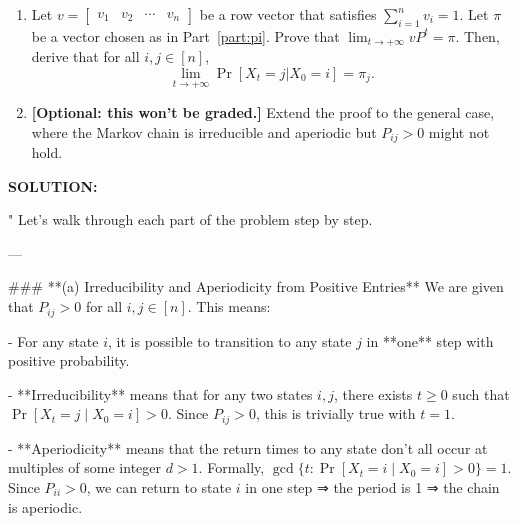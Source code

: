 \begin{enumerate}
\begin{enumerate}

    \item {} Let $v = \begin{bmatrix}v_1 & v_2 & \cdots & v_n\end{bmatrix}$ be a row vector that satisfies $\sum_{i=1}^nv_i = 1$. Let $\pi$ be a vector chosen as in Part~\ref{part:pi}. Prove that $\lim_{t\to+\infty}vP^t = \pi$. Then, derive that for all $i, j \in [n]$,
        \[\lim_{t\to+\infty}\Pr[X_t = j|X_0 = i] = \pi_j.\]


    \item {} \textbf{[Optional: this won't be graded.]} Extend the proof to the general case, where the Markov chain is irreducible and aperiodic but $P_{ij} > 0$ might not hold.
\end{enumerate}

\ifdefined\template
\begin{shaded}
\textbf{SOLUTION:}
\ifdefined\sol


"
Let's walk through each part of the problem step by step.

---

### **(a) Irreducibility and Aperiodicity from Positive Entries**
We are given that \( P_{ij} > 0 \) for all \( i, j \in [n] \). This means:

- For any state \( i \), it is possible to transition to any state \( j \) in **one** step with positive probability.
  
- **Irreducibility** means that for any two states \( i, j \), there exists \( t \geq 0 \) such that \( \Pr[X_t = j \mid X_0 = i] > 0 \). Since \( P_{ij} > 0 \), this is trivially true with \( t = 1 \).

- **Aperiodicity** means that the return times to any state don't all occur at multiples of some integer \( d > 1 \). Formally, \( \gcd\{t : \Pr[X_t = i \mid X_0 = i] > 0\} = 1 \). Since \( P_{ii} > 0 \), we can return to state \( i \) in one step ⇒ the period is 1 ⇒ the chain is aperiodic.


\end{shaded}
\end{enumerate}
